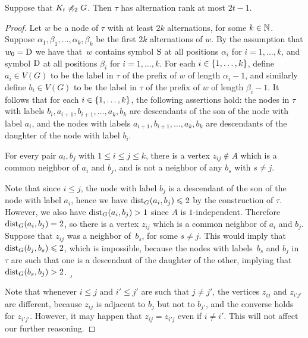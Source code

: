 \begin{lemma}\label{thm:alternation-rank-type-tree}
Suppose that  $K_t\not\preccurlyeq_{2} G$.
Then $\tau$ has alternation rank at most $2t-1$.
\end{lemma}
\begin{proof}
	Let $w$ be a node of $\tau$ with at least $2k$ alternations, for some $k\in \mathbb{N}$.
	Suppose $\alpha_1,\beta_1,\ldots,\alpha_k,\beta_k$ be the first $2k$ alternations of $w$.
	By the assumption that $w_0=\mathrm{D}$ we have that~$w$ contains symbol $\mathrm{S}$ at all positions $\alpha_i$ for $i=1,\ldots,k$, and symbol $\mathrm{D}$ at all positions $\beta_i$ for $i=1,\ldots,k$.
	For each $i\in \{1,\ldots,k\}$, define $a_i\in V(G)$ to be the label in $\tau$ of the prefix of $w$ of length $\alpha_i-1$, and similarly define $b_i\in V(G)$ to be the label in $\tau$ of the prefix of $w$
	of length $\beta_i-1$. 
	It follows that for each $i\in \{1,\ldots,k\}$, the following assertions hold:
	the nodes in $\tau$ with labels $b_i,a_{i+1},b_{i+1},\ldots,a_k,b_k$ are  descendants of the son of the node with label $a_i$,
	and the nodes with labels $a_{i+1},b_{i+1},\ldots,a_k,b_k$
	are descendants of the daughter of the node with label $b_i$.
	
	\begin{claim}\label{claim:minor}
		For every pair $a_i,b_j$ with $1\le i\le j\le k$, there is a vertex $z_{ij}\not\in A$	 which is a common neighbor of $a_i$ and $b_j$,
		and is not a neighbor of any $b_s$ with $s\neq j$.
	\end{claim}
	\begin{clproof}
		Note that since $i\le j$, the node with label $b_j$ is a descendant of the son of the node with label $a_i$, hence we have $\mathrm{dist}_G(a_i,b_j)\leqslant 2$ by the construction of $\tau$.
		However, we also have $\mathrm{dist}_G(a_i,b_j)>1$ since $A$
		is $1$-independent. Therefore $\mathrm{dist}_G(a_i,b_j)=2$, so there is a vertex $z_{ij}$ which is a common neighbor of $a_i$ and $b_j$. 
		Suppose that $z_{ij}$ was a neighbor of~$b_s$, for some $s\neq j$. This would imply that $\mathrm{dist}_G(b_j,b_s)\leqslant 2$, which is impossible, 
because
		 the nodes with labels~$b_s$ and $b_j$ in $\tau$ are such that one is a descendant of the daughter of the other, implying that $\mathrm{dist}_G(b_s,b_j)>2$.\hfill$\lrcorner$
	\end{clproof}
  
Note that whenever $i\leq j$ and $i'\leq j'$ are such that $j\neq j'$, the vertices $z_{ij}$ and $z_{i'j'}$ are different, because $z_{ij}$ is adjacent to $b_{j}$ but not to $b_{j'}$, and the converse holds for $z_{i'j'}$.
However, it may happen that $z_{ij}=z_{i'j}$ even if $i\neq i'$. This will not affect our further reasoning.


\end{proof}
